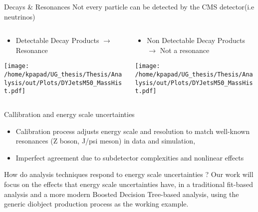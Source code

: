 \documentclass[bigger]{beamer}
\begin{document}
\begin{frame}[label={sec:orga42626a}]{Decays \& Resonances}
Not every particle can be detected by the CMS detector(i.e neutrinos)
\begin{columns}
\begin{column}{0.5\columnwidth}
\begin{itemize}
\item Detectable Decay Products \(\rightarrow\) Resonance
\end{itemize}
\begin{center}
\texttt{[image: /home/kpapad/UG\_thesis/Thesis/Analysis/out/Plots/DYJetsM50\_MassHist.pdf]}
\end{center}
\end{column}

\begin{column}{0.5\columnwidth}
\begin{itemize}
\item Non Detectable Decay Products \(\rightarrow\) Not a resonance
\end{itemize}
\begin{center}
\texttt{[image: /home/kpapad/UG\_thesis/Thesis/Analysis/out/Plots/DYJetsM50\_MassHist.pdf]}
\end{center}
\end{column}
\end{columns}
\end{frame}

\begin{frame}[label={sec:org2d3dc06}]{Callibration and energy scale uncertainties}
\begin{itemize}
\item Calibration process adjusts energy scale and resolution to match well-known resonances (Z boson, J/psi meson) in data and simulation,
\end{itemize}
\begin{itemize}
\item Imperfect agreement due to subdetector complexities and nonlinear effects
\end{itemize}
\begin{block}{How do analysis techniques respond to energy scale uncertainties ?}
Our work will focus on the effects that energy scale uncertainties have, in a traditional fit-based analysis and a more modern Boosted Decision Tree-based analysis, using the generic diobject production process as the working example.
\end{block}
\end{frame}
\end{document}
